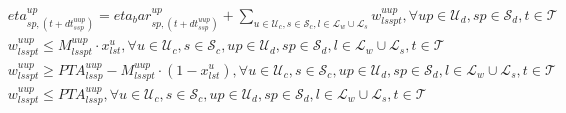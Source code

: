 \begin{align}
  & \mathit{eta}_{sp , \left(t + d t_{s sp}^{u up}\right)}^{up} = eta_bar_{sp , \left(t + d t_{s sp}^{u up}\right)}^{up} + \sum_{u \in \mathcal{U}_{c}, s \in \mathcal{S}_{c}, l \in \mathcal{L}_{w} \cup \mathcal{L}_{s}} w_{l s sp t}^{u up} , \forall up \in \mathcal{U}_{d} , sp \in \mathcal{S}_{d} , t \in \mathcal{T} \tag{eq\_0046} \\
  & w_{l s sp t}^{u up} \leq M_{l s sp t}^{u up} \cdot x_{l s t}^{u} , \forall u \in \mathcal{U}_{c} , s \in \mathcal{S}_{c} , up \in \mathcal{U}_{d} , sp \in \mathcal{S}_{d} , l \in \mathcal{L}_{w} \cup \mathcal{L}_{s} , t \in \mathcal{T} \tag{eq\_0047} \\
  & w_{l s sp t}^{u up} \geq \mathit{PTA}_{l s sp}^{u up} - M_{l s sp t}^{u up} \cdot \left(1 - x_{l s t}^{u}\right) , \forall u \in \mathcal{U}_{c} , s \in \mathcal{S}_{c} , up \in \mathcal{U}_{d} , sp \in \mathcal{S}_{d} , l \in \mathcal{L}_{w} \cup \mathcal{L}_{s} , t \in \mathcal{T} \tag{eq\_0048} \\
  & w_{l s sp t}^{u up} \leq \mathit{PTA}_{l s sp}^{u up} , \forall u \in \mathcal{U}_{c} , s \in \mathcal{S}_{c} , up \in \mathcal{U}_{d} , sp \in \mathcal{S}_{d} , l \in \mathcal{L}_{w} \cup \mathcal{L}_{s} , t \in \mathcal{T} \tag{eq\_0049} \\
\end{align}
